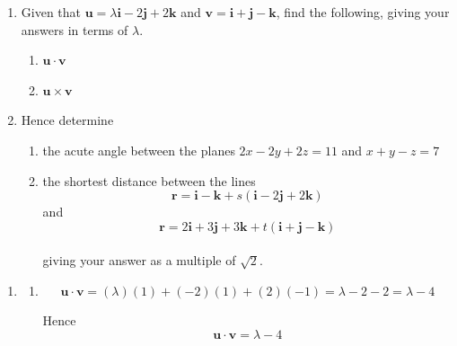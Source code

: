 \documentclass[leqno]{article}
\begin{document}
\begin{enumerate}[
  label=\textbf{\arabic*.},
  leftmargin=*,
  topsep=0pt,
  partopsep=0pt,
  parsep=0pt
]
\begin{enumerate}[label=\textbf{(\alph*)}]
  \item Given that $\mathbf{u}=\lambda\mathbf{i}-2\mathbf{j}+2\mathbf{k}$ and $\mathbf{v}=\mathbf{i}+\mathbf{j}-\mathbf{k}$, find the following, giving your answers in terms of $\lambda$.
  \begin{enumerate}[label=(\roman*)]
    \item $\mathbf{u}\cdot\mathbf{v}$ 
    \item $\mathbf{u}\times\mathbf{v}$  \\
  \end{enumerate}
  \item Hence determine
  \begin{enumerate}[label=(\roman*)]
    \item the acute angle between the planes $2x-2y+2z=11$ and $x+y-z=7$ 
    \item the shortest distance between the lines
    \[
    \mathbf{r}=\mathbf{i}-\mathbf{k}+s(\mathbf{i}-2\mathbf{j}+2\mathbf{k})
    \] 
    and
    \[
    \mathbf{r}=2\mathbf{i}+3\mathbf{j}+3\mathbf{k}+t(\mathbf{i}+\mathbf{j}-\mathbf{k})
    \]\\
    giving your answer as a multiple of $\sqrt{2}$. 
  \end{enumerate}
\end{enumerate}

\vspace*{30pt}

\begin{tcolorbox}[colback=white, colframe=scarlet, title={\textbf{Solution}}, breakable, grow to left by=6mm, grow to right by=10mm]
\begin{enumerate}[label=\textbf{(\alph*)}]
  \item
  \begin{enumerate}[label=(\roman*)]
    \item
    \[
    \mathbf{u}\cdot\mathbf{v}
    =(\lambda)(1)+(-2)(1)+(2)(-1)
    =\lambda-2-2
    =\lambda-4
    \]

    Hence
    \[
    \mathbf{u}\cdot\mathbf{v}=\lambda-4
    \]


\end{enumerate}
\end{enumerate}
\end{tcolorbox}
\end{enumerate}
\end{document}
